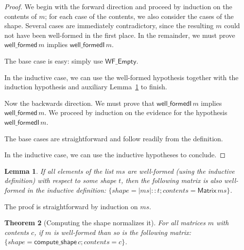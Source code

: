 \documentclass[11pt,conference]{IEEEtran}
\newcommand{\var}[1]{\mathit{#1}}
\newcommand{\func}[1]{\mathsf{#1}}
\newcommand{\iname}[1]{\textsf{#1}}
\theoremstyle{plain} %
\newtheorem{thm}{Theorem}[section]
\newtheorem{lem}[thm]{Lemma}
\theoremstyle{definition}
\theoremstyle{remark}
\begin{document}
\begin{proof}
    We begin with the forward direction and proceed by induction on the contents
    of \(m\); for each case of the contents, we also consider the cases of the
    shape. Several cases are immediately contradictory, since the resulting
    \(m\) could not have been well-formed in the first place. In the remainder,
    we must prove \(\func{well\_formed}\, m\) implies \(\func{well\_formedI}\,
    m\).

    The base case is easy: simply use \(\iname{WF\_Empty}\).

    In the inductive case, we can use the well-formed hypothesis together with
    the induction hypothesis and auxiliary Lemma~\ref{Lem:wfI_all_wf_t} to
    finish.

    Now the backwards direction. We must prove that \(\func{well\_formedI}\, m\)
    implies \(\func{well\_formed}\, m\). We proceed by induction on the evidence
    for the hypothesis \(\func{well\_formedI}\, m\).

    The base cases are straightforward and follow readily from the definition.

    In the inductive case, we can use the inductive hypotheses to conclude.
\end{proof}

\begin{lem}\label{Lem:wfI_all_wf_t}
    If all elements of the list \(\var{ms}\) are well-formed (using the inductive
    definition) with respect to some shape \(t\), then the following matrix is
    also well-formed in the inductive definition: \(\{ \var{shape} = |\var{ms}|
    :: t; \var{contents} = \func{Matrix}\, \var{ms} \}\).
\end{lem}

The proof is straightforward by induction on \(\var{ms}\).

\begin{thm}[Computing the shape normalizes it]\label{Th:compute_shape_wf_normalizes}
    For all matrices \(m\) with contents \(c\), if \(m\) is well-formed than so
    is the following matrix: \(\{ \var{shape} = \func{compute\_shape}\, c;
    \var{contents} = c \}\).
\end{thm}
\end{document}
